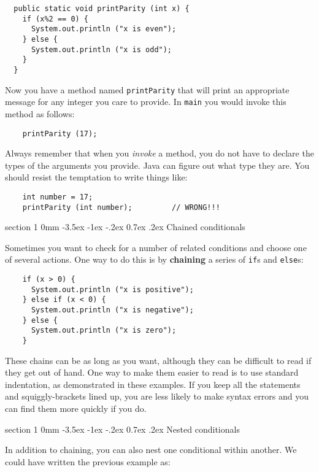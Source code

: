 \documentclass{book}
\makeatletter
\renewcommand{\section}{\@startsection 
    {section} {1} {0mm}%
    {-3.5ex \@plus -1ex \@minus -.2ex}%
    {0.7ex \@plus.2ex}%
    {\normalfont\Large\bfseries}}
\makeatother
\begin{document}
\begin{verbatim}
  public static void printParity (int x) {
    if (x%2 == 0) {
      System.out.println ("x is even");
    } else {
      System.out.println ("x is odd");
    }
  }
\end{verbatim}
%
Now you have a method named {\tt printParity} that will print
an appropriate message for any integer you care to provide.
In {\tt main} you would invoke this method as follows:

\begin{verbatim}
    printParity (17);
\end{verbatim}
%
Always remember that when you {\em invoke} a method, you do
not have to declare the types of the arguments you provide.
Java can figure out what type they are.  You should resist the
temptation to write things like:

\begin{verbatim}
    int number = 17;
    printParity (int number);         // WRONG!!!
\end{verbatim}

\section {Chained conditionals}

Sometimes you want to check for a number of related conditions
and choose one of several actions.  One way to do this is by
{\bf chaining} a series of {\tt if}s and {\tt else}s:

\begin{verbatim}
    if (x > 0) {
      System.out.println ("x is positive");
    } else if (x < 0) {
      System.out.println ("x is negative");
    } else {
      System.out.println ("x is zero");
    }
\end{verbatim}
%
These chains can be as long as you want, although they can
be difficult to read if they get out of hand.  One way to
make them easier to read is to use standard indentation,
as demonstrated in these examples.  If you keep all the
statements and squiggly-brackets lined up, you are less
likely to make syntax errors and you can find them more
quickly if you do.

\section{Nested conditionals}

In addition to chaining, you can also nest one conditional
within another.  We could have written the previous example
as:
\end{document}
